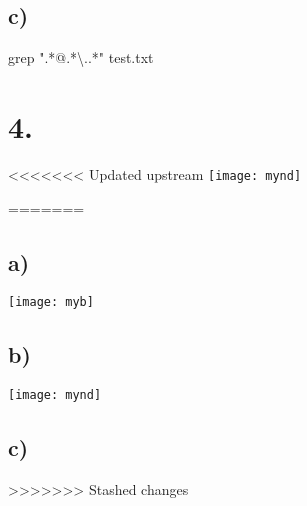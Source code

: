 \documentclass[]{article}
\begin{document}
\subsection*{c)}
grep ".*@.*\textbackslash..*"  test.txt

\section*{4.}

<<<<<<< Updated upstream
\texttt{[image: mynd]}

=======
\subsection*{a)}
\texttt{[image: myb]}

\subsection*{b)}
\texttt{[image: mynd]}

\subsection*{c)}

>>>>>>> Stashed changes
\end{document}
